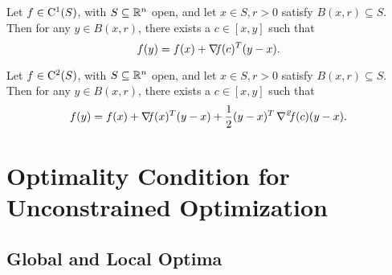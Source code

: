 \documentclass[10pt,a4paper]{article}
\begin{document}
\begin{theorem}
	Let $f\in \mathord{\mathrm{C^1}}(S)$, with $S\subseteq \mathbb{R}^n$ open, and let $x\in S, r>0$ satisfy $B(x,r)\subseteq S$. Then for any $y\in B(x,r)$, there exists a $c\in [x,y]$ such that 
	\begin{equation*}
		f(y) = f(x)+ \operatorname*{\mathit{\nabla \!f}} (c)^T(y-x).
	\end{equation*}
\end{theorem}
\begin{theorem}
	Let $f\in \mathord{\mathrm{C^2}}(S)$, with $S\subseteq \mathbb{R}^n$ open, and let $x\in S, r>0$ satisfy $B(x,r)\subseteq S$. Then for any $y\in B(x,r)$, there exists a $c\in [x,y]$ such that 
	\begin{equation*}
		f(y) = f(x)+ \operatorname*{\mathit{\nabla \!f}} (x)^T(y-x) +\frac{1}{2}(y-x)^T\operatorname*{\mathit{\nabla^2 \!f}}(c)(y-x).
	\end{equation*}
\end{theorem}
\section{Optimality Condition for Unconstrained Optimization}
\subsection{Global and Local Optima}
\end{document}
